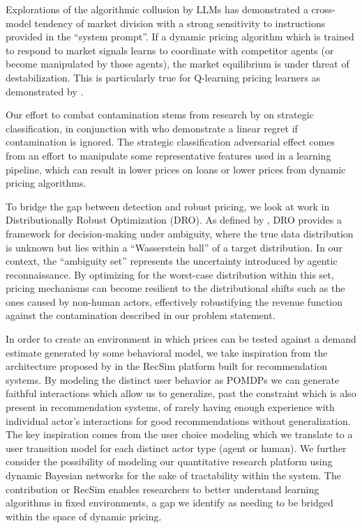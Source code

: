 Explorations of the algorithmic collusion by LLMs \parencite{fish_algorithmic_2025} has demonstrated a cross-model tendency of market division with a strong sensitivity to instructions provided in the ``system prompt''. If a dynamic pricing algorithm which is trained to respond to market signals learns to coordinate with competitor agents (or become manipulated by those agents), the market equilibrium is under threat of destabilization. This is particularly true for Q-learning pricing learners as demonstrated by \textcite{calvano_artificial_2018}.

Our effort to combat contamination stems from research by \textcite{hardt_strategic_2015} on strategic classification, in conjunction with \textcite{liu_contextual_2024} who demonstrate a linear regret if contamination is ignored. The strategic classification adversarial effect comes from an effort to manipulate some representative features used in a learning pipeline, which can result in lower prices on loans or lower prices from dynamic pricing algorithms.

To bridge the gap between detection and robust pricing, we look at work in Distributionally Robust Optimization (DRO). As defined by \textcite{kuhn_wasserstein_2024}, DRO provides a framework for decision-making under ambiguity, where the true data distribution is unknown but lies within a ``Wasserstein ball'' of a target distribution. In our context, the ``ambiguity set'' represents the uncertainty introduced by agentic reconnaissance. By optimizing for the worst-case distribution within this set, pricing mechanisms can become resilient to the distributional shifts such as the ones caused by non-human actors, effectively robustifying the revenue function against the contamination described in our problem statement.

In order to create an environment in which prices can be tested against a demand estimate generated by some behavioral model, we take inspiration from the architecture proposed by \textcite{ie_recsim_2019} in the RecSim platform built for recommendation systems. By modeling the distinct user behavior as POMDPs we can generate faithful interactions which allow us to generalize, past the constraint which is also present in recommendation systems, of rarely having enough experience with individual actor's interactions for good recommendations without generalization. The key inspiration comes from the user choice modeling which we translate to a user transition model for each distinct actor type (agent or human). We further consider the possibility of modeling our quantitative research platform using dynamic Bayesian networks for the sake of tractability within the system. The contribution or RecSim enables researchers to better understand learning algorithms in fixed environments, a gap we identify as needing to be bridged within the space of dynamic pricing.

